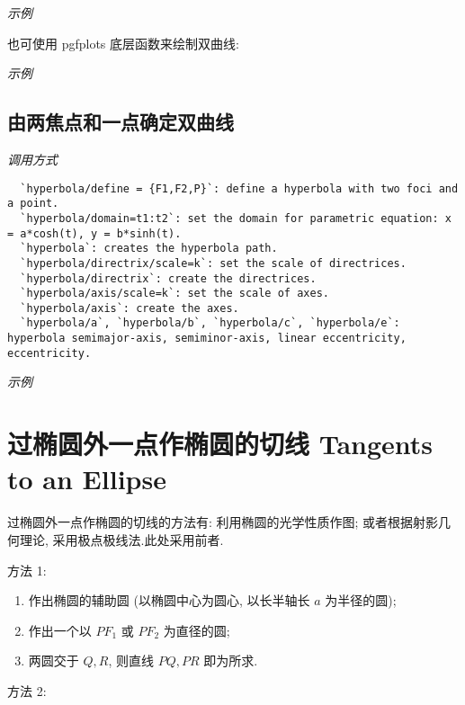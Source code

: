 \emph{示例}


也可使用 pgfplots 底层函数来绘制双曲线:

\emph{示例}


\subsection{由两焦点和一点确定双曲线}

\emph{调用方式}

\begin{verbatim}
  `hyperbola/define = {F1,F2,P}`: define a hyperbola with two foci and a point.
  `hyperbola/domain=t1:t2`: set the domain for parametric equation: x = a*cosh(t), y = b*sinh(t).
  `hyperbola`: creates the hyperbola path.
  `hyperbola/directrix/scale=k`: set the scale of directrices.
  `hyperbola/directrix`: create the directrices.
  `hyperbola/axis/scale=k`: set the scale of axes.
  `hyperbola/axis`: create the axes.
  `hyperbola/a`, `hyperbola/b`, `hyperbola/c`, `hyperbola/e`: hyperbola semimajor-axis, semiminor-axis, linear eccentricity, eccentricity.
\end{verbatim}

\emph{示例}


\section{过椭圆外一点作椭圆的切线 Tangents to an Ellipse}

过椭圆外一点作椭圆的切线的方法有: 利用椭圆的光学性质作图; 
或者根据射影几何理论, 采用极点极线法.此处采用前者.

方法 1: 

\begin{enumerate}
  \item 作出椭圆的辅助圆 (以椭圆中心为圆心, 以长半轴长 $a$ 为半径的圆);
  \item 作出一个以 $PF_1$ 或 $PF_2$ 为直径的圆;
  \item 两圆交于 $Q,R$, 则直线 $PQ,PR$ 即为所求.
\end{enumerate}


方法 2: 


